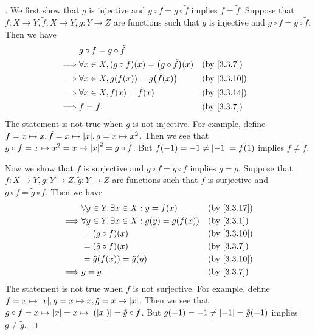 \begin{proof}[]
  We first show that \(g\) is injective and \(g \circ f = g \circ \tilde{f}\) implies \(f = \tilde{f}\).
  Suppose that \(f : X \to Y, \tilde{f} : X \to Y, g : Y \to Z\) are functions such that \(g\) is injective and \(g \circ f = g \circ \tilde{f}\).
  Then we have
  \begin{align*}
             & g \circ f = g \circ \tilde{f}                                                \\
    \implies & \forall x \in X, (g \circ f)(x) = \pa{g \circ \tilde{f}}(x) &  & \by{3.3.7}  \\
    \implies & \forall x \in X, g(f(x)) = g\pa{\tilde{f}(x)}               &  & \by{3.3.10} \\
    \implies & \forall x \in X, f(x) = \tilde{f}(x)                        &  & \by{3.3.14} \\
    \implies & f = \tilde{f}.                                              &  & \by{3.3.7}
  \end{align*}
  The statement is not true when \(g\) is not injective.
  For example, define \(f = x \mapsto x, \tilde{f} = x \mapsto \abs{x}, g = x \mapsto x^2\).
  Then we see that \(g \circ f = x \mapsto x^2 = x \mapsto \left\lvert x\right\rvert^2 = g \circ \tilde{f}\).
  But \(f(-1) = -1 \neq \left\lvert-1\right\rvert = \tilde{f}(1)\) implies \(f \neq \tilde{f}\).

  Now we show that \(f\) is surjective and \(g \circ f = \tilde{g} \circ f\) implies \(g = \tilde{g}\).
  Suppose that\(f : X \to Y, g : Y \to Z, \tilde{g} : Y \to Z\) are functions such that \(f\) is surjective and \(g \circ f = \tilde{g} \circ f\).
  Then we have
  \begin{align*}
             & \forall y \in Y, \exists x \in X : y = f(x)       &  & \by{3.3.17} \\
    \implies & \forall y \in Y, \exists x \in X : g(y) = g(f(x)) &  & \by{3.3.1}  \\
             & = (g \circ f)(x)                                  &  & \by{3.3.10} \\
             & = (\tilde{g} \circ f)(x)                          &  & \by{3.3.7}  \\
             & = \tilde{g}(f(x)) = \tilde{g}(y)                  &  & \by{3.3.10} \\
    \implies & g = \tilde{g}.                                    &  & \by{3.3.7}
  \end{align*}
  The statement is not true when \(f\) is not surjective.
  For example, define \(f = x \mapsto \abs{x}, g = x \mapsto x, \tilde{g} = x \mapsto \abs{x}\).
  Then we see that \(g \circ f = x \mapsto \left\lvert x\right\rvert = x \mapsto \left\lvert(\left\lvert x\right\rvert)\right\rvert = \tilde{g} \circ f\).
  But \(g(-1) = -1 \neq \left\lvert-1\right\rvert = \tilde{g}(-1)\) implies \(g \neq \tilde{g}\).
\end{proof}

